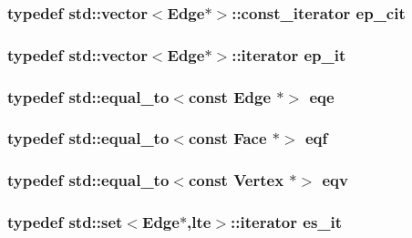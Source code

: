 \subsubsection{\setlength{\rightskip}{0pt plus 5cm}typedef std::vector$<${\bf Edge}$\ast$$>$::const\_\-iterator {\bf ep\_\-cit}}\label{meshmorph_8h_7bbde133ac39ecfc284c91b3da140e56}


\subsubsection{\setlength{\rightskip}{0pt plus 5cm}typedef std::vector$<${\bf Edge}$\ast$$>$::iterator {\bf ep\_\-it}}\label{meshmorph_8h_2c2a5a920658be1c063b7bb97132ad02}


\subsubsection{\setlength{\rightskip}{0pt plus 5cm}typedef std::equal\_\-to$<$const {\bf Edge} $\ast$$>$ {\bf eqe}}\label{meshmorph_8h_d000fbd6ebbfd4ec6a1091b0fdade132}


\subsubsection{\setlength{\rightskip}{0pt plus 5cm}typedef std::equal\_\-to$<$const {\bf Face} $\ast$$>$ {\bf eqf}}\label{meshmorph_8h_60b006c4da96f6f67a50b4dd7a1c14bd}


\subsubsection{\setlength{\rightskip}{0pt plus 5cm}typedef std::equal\_\-to$<$const {\bf Vertex} $\ast$$>$ {\bf eqv}}\label{meshmorph_8h_5e4c69ea7515d6d451847631e6db1a04}


\subsubsection{\setlength{\rightskip}{0pt plus 5cm}typedef std::set$<${\bf Edge}$\ast$,{\bf lte}$>$::iterator {\bf es\_\-it}}\label{meshmorph_8h_be3f719aca3e5fff13f0f0384815ca50}



